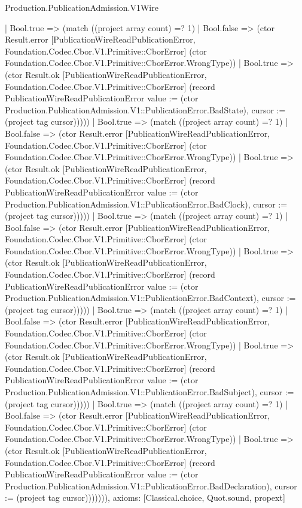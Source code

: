 \begin{lexlean}{Production.PublicationAdmission.V1Wire}
\begin{semanticmodule}
{                | Bool.true => (match ((project array count) =? 1)
                  | Bool.false => (ctor Result.error [PublicationWireReadPublicationError, Foundation.Codec.Cbor.V1.Primitive::CborError] (ctor Foundation.Codec.Cbor.V1.Primitive::CborError.WrongType))
                  | Bool.true => (ctor Result.ok [PublicationWireReadPublicationError, Foundation.Codec.Cbor.V1.Primitive::CborError] (record PublicationWireReadPublicationError {value := (ctor Production.PublicationAdmission.V1::PublicationError.BadState), cursor := (project tag cursor)}))))
              | Bool.true => (match ((project array count) =? 1)
                | Bool.false => (ctor Result.error [PublicationWireReadPublicationError, Foundation.Codec.Cbor.V1.Primitive::CborError] (ctor Foundation.Codec.Cbor.V1.Primitive::CborError.WrongType))
                | Bool.true => (ctor Result.ok [PublicationWireReadPublicationError, Foundation.Codec.Cbor.V1.Primitive::CborError] (record PublicationWireReadPublicationError {value := (ctor Production.PublicationAdmission.V1::PublicationError.BadClock), cursor := (project tag cursor)}))))
            | Bool.true => (match ((project array count) =? 1)
              | Bool.false => (ctor Result.error [PublicationWireReadPublicationError, Foundation.Codec.Cbor.V1.Primitive::CborError] (ctor Foundation.Codec.Cbor.V1.Primitive::CborError.WrongType))
              | Bool.true => (ctor Result.ok [PublicationWireReadPublicationError, Foundation.Codec.Cbor.V1.Primitive::CborError] (record PublicationWireReadPublicationError {value := (ctor Production.PublicationAdmission.V1::PublicationError.BadContext), cursor := (project tag cursor)}))))
          | Bool.true => (match ((project array count) =? 1)
            | Bool.false => (ctor Result.error [PublicationWireReadPublicationError, Foundation.Codec.Cbor.V1.Primitive::CborError] (ctor Foundation.Codec.Cbor.V1.Primitive::CborError.WrongType))
            | Bool.true => (ctor Result.ok [PublicationWireReadPublicationError, Foundation.Codec.Cbor.V1.Primitive::CborError] (record PublicationWireReadPublicationError {value := (ctor Production.PublicationAdmission.V1::PublicationError.BadSubject), cursor := (project tag cursor)}))))
        | Bool.true => (match ((project array count) =? 1)
          | Bool.false => (ctor Result.error [PublicationWireReadPublicationError, Foundation.Codec.Cbor.V1.Primitive::CborError] (ctor Foundation.Codec.Cbor.V1.Primitive::CborError.WrongType))
          | Bool.true => (ctor Result.ok [PublicationWireReadPublicationError, Foundation.Codec.Cbor.V1.Primitive::CborError] (record PublicationWireReadPublicationError {value := (ctor Production.PublicationAdmission.V1::PublicationError.BadDeclaration), cursor := (project tag cursor)})))))),
  axioms: [Classical.choice, Quot.sound, propext]
}


\end{semanticmodule}
\end{lexlean}
